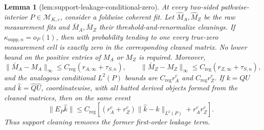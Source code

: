 \documentclass{article}
\newtheorem{lemma}{Lemma}
\begin{document}
\begin{lemma}[lem:support-leakage-conditional-zero]\label{lem:support-leakage-conditional-zero}
At every two-sided pathwise-interior \(P\in\mathcal M_{K,\varepsilon}\), consider a foldwise coherent fit.  Let \(\widehat M_A,\widehat M_Z\) be the raw measurement fits and \(\bar M_A,\bar M_Z\) their threshold-and-renormalize cleanings.  If \(\kappa_{\mathrm{supp},n}=o_P(1)\), then with probability tending to one every true-zero measurement cell is exactly zero in the corresponding cleaned matrix.  No lower bound on the positive entries of \(M_A\) or \(M_Z\) is required.  Moreover,
\[
 \|\bar M_A-M_A\|_\infty\leq C_{\mathrm{reg}}(r_{A,\infty}+\tau_{S,n}),
 \qquad
 \|\bar M_Z-M_Z\|_\infty\leq C_{\mathrm{reg}}(r_{Z,\infty}+\tau_{S,n}),
\]
and the analogous conditional \(L^2(P)\) bounds are \(C_{\mathrm{reg}}r_A^c\) and \(C_{\mathrm{reg}}r_Z^c\).  If \(k=QU\) and \(\widehat k=\widehat Q\widehat U\), coordinatewise, with all hatted derived objects formed from the cleaned matrices, then on the same event
\[
 \|E_P\widehat k\|
 \leq C_{\mathrm{reg}}\left[
 (r_A^c+r_Z^c)\|\widehat k-k\|_{L^2(P)}+r_A^cr_Z^c
 \right].
\]
Thus support cleaning removes the former first-order leakage term.
\end{lemma}
\end{document}
